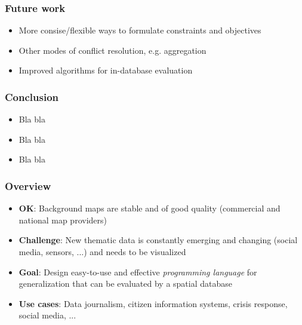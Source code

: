 \documentclass{beamer}
\begin{document}


\frame
{
  \frametitle{Future work}
  \begin{itemize}
  \item More consise/flexible ways to formulate constraints and objectives
  \item Other modes of conflict resolution, e.g. aggregation
  \item Improved algorithms for in-database evaluation
  \end{itemize}
}





\frame
{
  \frametitle{Conclusion}
  \begin{center}
  \end{center}
  
  \begin{itemize}
  \item Bla bla
  \item Bla bla
  \item Bla bla
  \end{itemize}
}


\frame
{
  \frametitle{Overview}
  \begin{center}
  \end{center}
  
  \begin{itemize}
  \item \textbf{OK}: Background maps are stable and of good quality (commercial and national map providers)
  \item \textbf{Challenge}: New thematic data is constantly emerging and changing (social media, sensors, ...) and needs to be visualized
  \item \textbf{Goal}: Design easy-to-use and effective \emph{programming language} for generalization that can be evaluated by a spatial database  \item \textbf{Use cases}: Data journalism, citizen information systems, crisis response, social media, ...
  \end{itemize}
}
\end{document}
